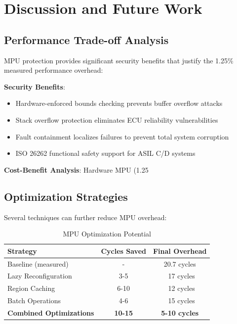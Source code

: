 \chapter{Discussion and Future Work}
\label{sec:optimization}

\section{Performance Trade-off Analysis}

MPU protection provides significant security benefits that justify the 1.25\% measured performance overhead:

\textbf{Security Benefits}:
\begin{itemize}
    \item Hardware-enforced bounds checking prevents buffer overflow attacks
    \item Stack overflow protection eliminates ECU reliability vulnerabilities
    \item Fault containment localizes failures to prevent total system corruption
    \item ISO 26262 functional safety support for ASIL C/D systems
\end{itemize}

\textbf{Cost-Benefit Analysis}: Hardware MPU (1.25%

\section{Optimization Strategies}

Several techniques can further reduce MPU overhead:

\begin{table}[h]
\centering
\caption{MPU Optimization Potential}
\begin{tabular}{@{}lcc@{}}
\toprule
Strategy & Cycles Saved & Final Overhead \\
\midrule
Baseline (measured) & - & 20.7 cycles \\
Lazy Reconfiguration & 3-5 & ~17 cycles \\
Region Caching & 6-10 & ~12 cycles \\
Batch Operations & 4-6 & ~15 cycles \\
\textbf{Combined Optimizations} & \textbf{10-15} & \textbf{5-10 cycles} \\
\bottomrule
\end{tabular}
\end{table}

